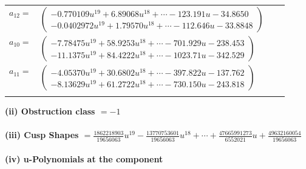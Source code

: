 \documentclass[1p]{elsarticle_modified}
\theoremstyle{definition}
\begin{document}
\begin{tabular}{m{7pt} m{180pt} m{7pt} m{180pt} }
\flushright $a_{12}=$&$\begin{pmatrix}-0.770109 u^{19}+6.89068 u^{18}+\cdots-123.191 u-34.8650\\-0.0402972 u^{19}+1.79570 u^{18}+\cdots-112.646 u-33.8848\end{pmatrix}$ \\
\flushright $a_{10}=$&$\begin{pmatrix}-7.78475 u^{19}+58.9253 u^{18}+\cdots-701.929 u-238.453\\-11.1375 u^{19}+84.4222 u^{18}+\cdots-1023.71 u-342.529\end{pmatrix}$ \\
\flushright $a_{11}=$&$\begin{pmatrix}-4.05370 u^{19}+30.6802 u^{18}+\cdots-397.822 u-137.762\\-8.13629 u^{19}+61.2722 u^{18}+\cdots-730.150 u-243.818\end{pmatrix}$\\&\end{tabular}
\flushleft \textbf{(ii) Obstruction class $= -1$}\\~\\
\flushleft \textbf{(iii) Cusp Shapes $= \frac{1862218903}{19656063} u^{19}-\frac{13770753601}{19656063} u^{18}+\cdots+\frac{47665991273}{6552021} u+\frac{49632160054}{19656063}$}\\~\\
\newpage\renewcommand{\arraystretch}{1}
\flushleft \textbf{(iv) u-Polynomials at the component}\newline \\
\end{document}
